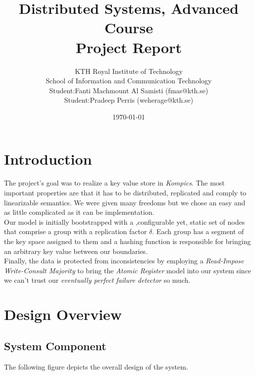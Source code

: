 \documentclass[a4paper, 11pt]{article}
\title{Distributed Systems, Advanced Course \\ 
		Project Report}
\author{KTH Royal Institute of Technology \\ 
	School of Information and Communication Technology \\
	Student:Fanti Machmount Al Samisti (fmas@kth.se) \\
	Student:Pradeep Perris (weherage@kth.se)}
\date{\today{}}
\begin{document}
\maketitle

\tableofcontents

\clearpage

\section{Introduction}

The project's goal was to realize a key value store in \textit{Kompics}. The most important properties are that it has to be distributed, replicated and comply to linearizable semantics. We were given many freedoms but we chose an easy and as little complicated as it can be implementation. \\
Our model is initially bootstrapped with a ,configurable yet, static set of nodes that comprise a group with a replication factor $\delta$. Each group has a segment of the key space assigned to them and a hashing function is responsible for bringing an arbitrary key value between our boundaries. \\
Finally, the data is protected from inconsistencies by employing a \textit{Read-Impose Write-Consult Majority} to bring the \textit{Atomic Register} model into our system since we can't trust our \textit{eventually perfect failure detector} so much.

\section{Design Overview}

\subsection{System Component}
The following figure depicts the overall design of the system.
\end{document}
